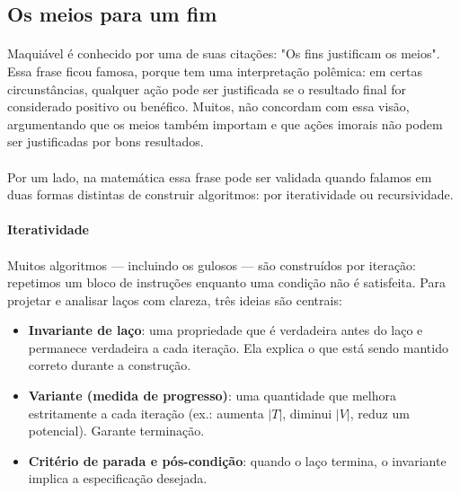 \documentclass[12pt,a4paper]{article}
\def\emph#1{#1}%
\begin{document}
\subsection{Os meios para um fim}

\paragraph{}
Maquiável é conhecido por uma de suas citações: "Os fins justificam os meios". Essa frase ficou famosa, porque tem uma interpretação polêmica: em certas circunstâncias, qualquer ação pode ser justificada se o resultado final for considerado positivo ou benéfico. Muitos, não concordam com essa visão, argumentando que os meios também importam e que ações imorais não podem ser justificadas por bons resultados.

\paragraph{}
Por um lado, na matemática essa frase pode ser validada quando falamos em duas formas distintas de construir algoritmos: por \emph{iteratividade} ou \emph{recursividade}.

\paragraph{Iteratividade}
\paragraph{}
Muitos algoritmos — incluindo os gulosos — são construídos por \emph{iteração}: repetimos um bloco de instruções enquanto uma condição não é satisfeita. Para projetar e analisar laços com clareza, três ideias são centrais:

\begin{itemize}\setlength{\itemsep}{2pt}
    \item \textbf{Invariante de laço}: uma propriedade que é verdadeira antes do laço e permanece verdadeira a cada iteração. Ela explica \emph{o que} está sendo mantido correto durante a construção.
    \item \textbf{Variante (medida de progresso)}: uma quantidade que melhora estritamente a cada iteração (ex.: aumenta $|T|$, diminui $|V|$, reduz um potencial). Garante \emph{terminação}.
    \item \textbf{Critério de parada e pós-condição}: quando o laço termina, o invariante implica a especificação desejada.
\end{itemize}
\end{document}
